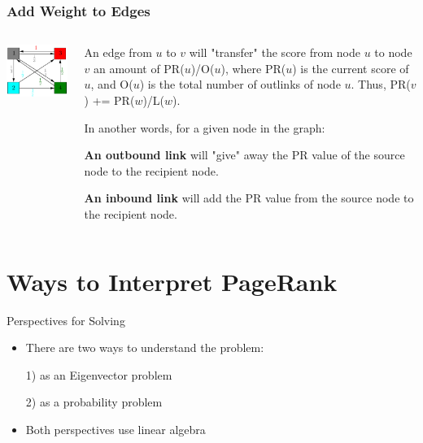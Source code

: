 \documentclass{beamer}
\begin{document}
\begin{frame}
\frametitle{Add Weight to Edges}
\begin{columns}
    \begin{column}{0.5\textwidth}
        \includegraphics[width=\textwidth]{weighted.png}
    \end{column}
    \begin{column}{0.5\textwidth}
        \begin{outline}
            
        \end{outline}
        An edge from $u$ to $v$ will "transfer" the score from node $u$ to node $v$ an amount of PR($u$)/O($u$), where PR($u$) is the current score of $u$, and O($u$) is the total number of outlinks of node $u$.  Thus, PR($v$) += PR($w$)/L($w$). 
        
        In another words, for a given node in the graph:

        \textbf{An outbound link} will "give" away the PR value of the source node to the recipient node.  

        \textbf{An inbound link} will add the PR value from the source node to the recipient node.
    \end{column}
\end{columns}
\end{frame}

\section{Ways to Interpret PageRank}
\begin{frame}[t]{Perspectives for Solving}
    \begin{itemize}
        \setlength\itemsep{1em}
        \item There are two ways to understand the problem:
        \item[1)] as an Eigenvector problem
        \item[2)] as a probability problem
        \item Both perspectives use linear algebra 
    \end{itemize}
\end{frame}
\end{document}
